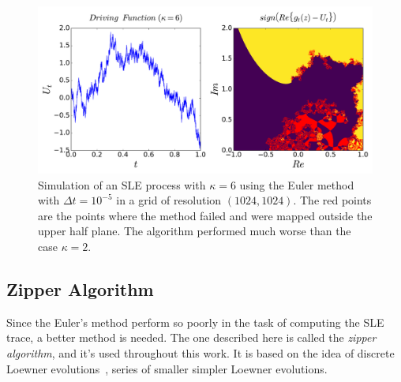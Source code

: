 \begin{figure}
\begin{center}
    \includegraphics[scale=0.45]{chapters/ch4-sle/figs/euler2}
\end{center}
\caption{Simulation of an SLE process with $\kappa=6$ using the Euler method
    with $\Delta t = 10^{-5}$ in a grid of resolution $(1024, 1024)$. 
    The red points are the points where the method failed and were mapped
    outside the upper half plane. The algorithm performed much worse than
    the case $\kappa=2$.}
\label{fig:euler2}
\end{figure}


\subsection{Zipper Algorithm}
\label{ss:zipper}

Since the Euler's method perform so poorly in the task of computing the SLE
trace, a better method is needed. The one described here is called the
\textit{zipper algorithm}, and it's used throughout this work. It is based on
the idea of discrete Loewner evolutions~\cite{Bauer2003, Kennedy2009}, series
of smaller simpler Loewner evolutions.

